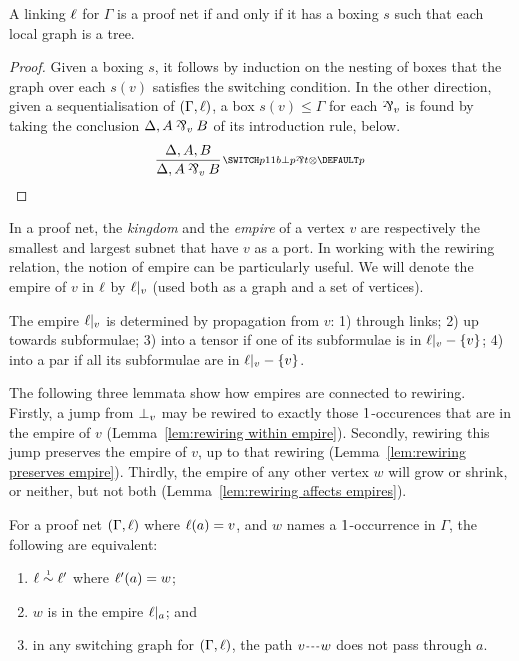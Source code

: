 \documentclass{lmcs}
\begin{document}
\begin{proposition}
\label{prop:scoping correctness}
A linking $\ell$ for $\Gamma$ is a proof net if and only if it has a boxing $s$ such that each local graph is a tree.
\end{proposition}

\begin{proof}
Given a boxing $s$, it follows by induction on the nesting of boxes that the graph over each $s(v)$ satisfies the switching condition.
%
In the other direction, given a sequentialisation of $(\Gamma,\ell)$, a box $s(v)\leq\Gamma$ for each $\named v\parr$ is found by taking the conclusion $\Delta, A\named v\parr B$ of its introduction rule, below.
\[
	\infer[\MLLlabel p]{\Delta,A\named v\parr B}{\Delta,A,B}
\]
\end{proof}


In a proof net, the \emph{kingdom} and the \emph{empire} of a vertex $v$ are respectively the smallest and largest subnet that have $v$ as a port.
%
In working with the rewiring relation, the notion of empire can be particularly useful.
%
We will denote the empire of $v$ in $\ell$ by $\emp v$ (used both as a graph and a set of vertices).



\begin{proposition}
\label{prop:empire propagation}
The empire $\emp v$ is determined by propagation from $v$: 1) through links; 2) up towards subformulae; 3) into a tensor if one of its subformulae is in $\emp v-\{v\}$; 4) into a par if all its subformulae are in $\emp v-\{v\}$.
\end{proposition}


\noindent
The following three lemmata show how empires are connected to rewiring.
%
Firstly, a jump from $\bot_{v}$ may be rewired to exactly those $1$-occurences that are in the empire of $v$ (Lemma~\ref{lem:rewiring within empire}).
%
Secondly, rewiring this jump preserves the empire of $v$, up to that rewiring (Lemma~\ref{lem:rewiring preserves empire}).
%
Thirdly, the empire of any other vertex $w$ will grow or shrink, or neither, but not both (Lemma~\ref{lem:rewiring affects empires}).



\begin{lemma}
\label{lem:rewiring within empire}
For a proof net $(\Gamma,\ell)$ where $\ell(a)=v$, and $w$ names a $1$-occurrence in $\Gamma$, the following are equivalent:
%
\begin{enumerate}
	\item
$\links\perm*\links'$ where $\ell'(a)=w$;
	\item
$w$ is in the empire $\emp a$; and
	\item
in any switching graph for $(\Gamma,\ell)$, the path $\path vw$ does not pass through $a$.
\end{enumerate}
\end{lemma}
\end{document}
